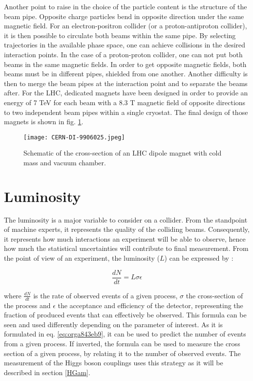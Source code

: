 Another point to raise in the choice of the particle content is the structure of the beam pipe.
Opposite charge particles bend in opposite direction under the same magnetic field.
For an electron-positron collider (or a proton-antiproton collider), it is then possible to circulate both beams within the same pipe.
By selecting trajectories in the available phase space, one can achieve collisions in the desired interaction points.
In the case of a proton-proton collider, one can not put both beams in the same magnetic fields.
In order to get opposite magnetic fields, both beams must be in different pipes, shielded from one another.
Another difficulty is then to merge the beam pipes at the interaction point and to separate the beams after.
For the LHC, dedicated magnets have been designed in order to provide an energy of 7 TeV for each beam with a 8.3 T magnetic field of opposite directions to two independent beam pipes within a single cryostat.
The final design of those magnets is shown in fig. \ref{fig:org5470cc3}.

\begin{figure}[htbp]
\centering
\texttt{[image: CERN-DI-9906025.jpeg]}
\caption{\label{fig:org5470cc3}
Schematic of the cross-section of an LHC dipole magnet with cold mass and vacuum chamber.\cite{CERN-DI-9906025}}
\end{figure}

\section{Luminosity}
\label{sec:orgdd48b5f}
\label{sec:Detector_luminosity}

The luminosity is a major variable to consider on a collider.
From the standpoint of machine experts, it represents the quality of the colliding beams.
Consequently, it represents how much interactions an experiment will be able to observe, hence how much the statistical uncertainties will contribute to final measurement.
From the point of view of an experiment, the luminosity ($L$) can be expressed by :

\begin{equation}
\label{eq:orga843eb9}
\frac{dN}{dt} = L\sigma\epsilon
\end{equation}

where $\frac{dN}{dt}$ is the rate of observed events of a given process, $\sigma$ the cross-section of the process and $\epsilon$ the acceptance and efficiency of the detector, representing the fraction of produced events that can effectively be observed.
This formula can be seen and used differently depending on the parameter of interest.
As it is formulated in eq. \ref{eq:orga843eb9}, it can be used to predict the number of events from a given process.
If inverted, the formula can be used to measure the cross section of a given process, by relating it to the number of observed events.
The measurement of the Higgs boson couplings uses this strategy as it will be described in section \ref{HGam}.

